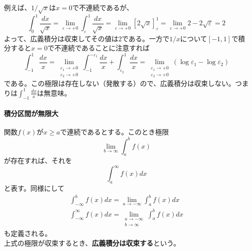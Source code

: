 \documentclass[a4j,dvipdfmx]{jsarticle}
\begin{document}
                    例えば、$1/\sqrt{x}$は$x=0$で不連続であるが、
                    \begin{equation*}
                        \int_{0}^{1}\frac{dx}{\sqrt{x}}=\lim_{\varepsilon\to +0}\int_{\varepsilon}^{1}\frac{dx}{\sqrt{x}}=\lim_{\varepsilon\to+0}\left[2\sqrt{x}\right]_{\varepsilon}^1=\lim_{\varepsilon\to +0}2-2\sqrt{\varepsilon}=2
                    \end{equation*}
                    よって、広義積分は収束してその値は$2$である。一方で$1/x$について$[-1,1]$で積分すると$x=0$で不連続であることに注意すれば
                    \begin{equation*}
                        \int_{-1}^{1}\frac{dx}{x}=\lim_{\substack{\varepsilon_1\to +0\\\varepsilon_2\to +0}}\int_{-1}^{-\varepsilon_1}\frac{dx}{x}+\int_{\varepsilon_2}^{1}\frac{dx}{x}=\lim_{\substack{\varepsilon_1\to +0\\\varepsilon_2\to +0}}\left(\log\varepsilon_1-\log\varepsilon_2\right)
                    \end{equation*}
                    である。この極限は存在しない（発散する）ので、広義積分は収束しない。つまりは$\displaystyle \int_{-1}^{1}\frac{dx}{x}$は無意味。
                \clearpage
                \paragraph{積分区間が無限大}
                    関数$f(x)$が$x\geq a$で連続であるとする。このとき極限
                    \begin{equation*}
                        \lim_{b\to \infty}\int_{a}^{b}f(x)
                    \end{equation*}
                    が存在すれば、それを
                    \begin{equation*}
                        \int_{a}^{\infty}f(x)dx
                    \end{equation*}
                    と表す。同様にして
                    \begin{align*}
                        \int_{-\infty}^{b}f(x)dx=\lim_{a\to -\infty}\int_{a}^{b}f(x)dx\\
                        \int_{-\infty}^{\infty}f(x)dx=\lim_{\substack{a\to -\infty\\b\to\infty}}\int_{a}^{b}f(x)dx
                    \end{align*}
                    も定義される。\\
                    上式の極限が収束するとき、\textbf{広義積分は収束する}という。\\
\end{document}
